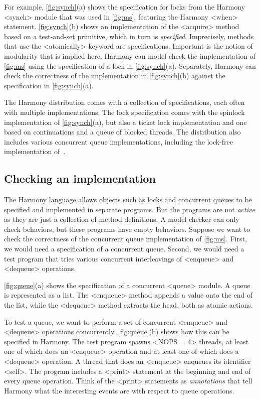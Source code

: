 \documentclass[twocolumn]{article}
\begin{document}
For example, \autoref{fig:synch}(a) shows the specification for locks
from the Harmony <{synch}> module that was used in \autoref{fig:ms},
featuring the Harmony <{when}> statement.
\autoref{fig:synch}(b) shows an implementation of the <{acquire}>
method based on a test-and-set primitive, which in turn is
\emph{specified}.
Imprecisely, methods that use the <{atomically}> keyword are specifications.
Important is the notion of modularity that is implied here.
Harmony can model check the implementation of \autoref{fig:ms} using
the specification of a lock in \autoref{fig:synch}(a).
Separately, Harmony can check the correctness of the implementation in
\autoref{fig:synch}(b) against the specification in
\autoref{fig:synch}(a).

The Harmony distribution comes with a collection of specifications,
each often with multiple implementations.  The lock specification
comes with the spinlock implementation of \autoref{fig:synch}(a), but
also a ticket lock implementation and one based on continuations and
a queue of blocked threads.  The distribution also includes various concurrent
queue implementations, including the lock-free implementation
of~\cite{MS96}.

\subsection{Checking an implementation}

The Harmony language allows objects such as locks and concurrent queues
to be specified and implemented in separate programs.  But the programs
are not \emph{active} as they are just a collection of method definitions.
A model checker can only check behaviors, but these programs have empty
behaviors.
Suppose we want to check the correctness of the concurrent queue
implementation of \autoref{fig:ms}.  First, we would need a specification
of a concurrent queue.  Second, we would need a test program that tries
various concurrent interleavings of <{enqueue}> and <{dequeue}> operations.

\autoref{fig:queue}(a) shows the specification of a concurrent
<{queue}> module.  A queue is represented as a list.
The <{enqueue}> method appends a value onto the end of the list,
while the <{dequeue}> method extracts the head, both as atomic actions.

To test a queue, we want to perform a set of concurrent <{enqueue}>
and <{dequeue}> operations concurrently.
\autoref{fig:queue}(b) shows how this can be specified in Harmony.
The test program spawns <{NOPS = 4}> threads, at least one of which
does an <{enqueue}> operation and at least one of which does a
<{dequeue}> operation.  A thread that does an <{enqueue}> enqueues
its identifier <{self}>.  The program
includes a <{print}> statement at the beginning and end of every queue
operation.  Think of the <{print}> statements as \emph{annotations}
that tell Harmony what the interesting events are with respect to
queue operations.
\end{document}
